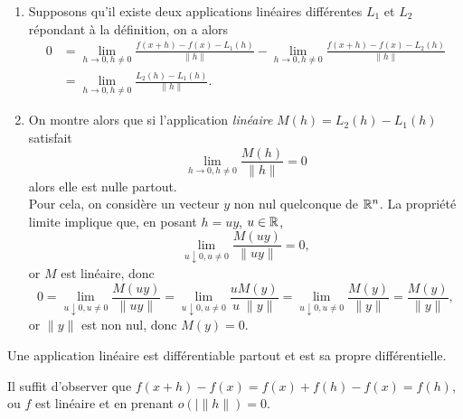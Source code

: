 \proof
\begin{enumerate}
  \item Supposons qu'il existe deux applications linéaires différentes $L_1$ et $L_2$ répondant à la définition, on a alors
  \begin{align*}
    0 & = \lim_{h\to 0, h \neq 0} \frac{f(x+h) - f(x) - L_1(h)}{\|h\|}
    - \lim_{h\to 0, h \neq 0} \frac{f(x+h) - f(x) - L_2(h)}{\|h\|} \\
    & = \lim_{h\to 0, h \neq 0} \frac{L_2(h) - L_1(h)}{\|h\|}. 
  \end{align*}
  \item On montre alors que si l'application {\em linéaire} $M(h) = L_2(h) - L_1(h)$ satisfait
  $$
  \lim_{h \to 0, h \neq 0} \frac{M(h)}{\|h\|} 
  = 0
  $$
  alors elle est nulle partout. \\
  Pour cela, on considère un vecteur $y$ non nul quelconque de $\mathbb{R}^n$. La propriété limite implique que, en posant $h = uy$, $u \in \mathbb{R}$, 
  $$
  \lim_{u \downarrow 0, u \neq 0} \frac{M(u y)}{\|u y\|} = 0,
  $$  
  or $M$ est linéaire, donc 
  $$
  0
  = \lim_{u \downarrow 0, u \neq 0} \frac{M(u y)}{\|u y\|} 
  = \lim_{u \downarrow 0, u \neq 0} \frac{u M(y)}{u \; \|y\|} 
  = \lim_{u \downarrow 0, u \neq 0} \frac{M(y)}{\|y\|} 
  = \frac{M(y)}{\|y\|},
  $$  
  or $\|y\|$ est non nul, donc $M(y) = 0$.
\end{enumerate}
\eproof

\begin{corollary*} 
  Une application linéaire est différentiable partout et est sa propre différentielle. 
\end{corollary*}

\proof
Il suffit d'observer que $f(x+h) - f(x) = f(x) + f(h) - f(x) = f(h)$, ou $f$ est linéaire et en prenant $o(|\|h\|) = 0$.
\eproof
% 

